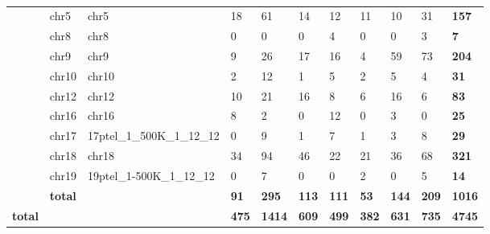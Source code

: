 \begin{samepage}
\begin{table}[h!]
\begin{tabular}{lllllllllll}
\textbf{}      & chr5                & chr5                            & 18             & 61             & 14             & 12             & 11             & 10             & 31             & \textbf{157}   \\
\textbf{}      & chr8                & chr8                            & 0              & 0              & 0              & 4              & 0              & 0              & 3              & \textbf{7}     \\
\textbf{}      & chr9                & chr9                            & 9              & 26             & 17             & 16             & 4              & 59             & 73             & \textbf{204}   \\
\textbf{}      & chr10               & chr10                           & 2              & 12             & 1              & 5              & 2              & 5              & 4              & \textbf{31}    \\
\textbf{}      & chr12               & chr12                           & 10             & 21             & 16             & 8              & 6              & 16             & 6              & \textbf{83}    \\
\textbf{}      & chr16               & chr16                           & 8              & 2              & 0              & 12             & 0              & 3              & 0              & \textbf{25}    \\
\textbf{}      & chr17               & 17ptel\_1\_500K\_1\_12\_12      & 0              & 9              & 1              & 7              & 1              & 3              & 8              & \textbf{29}    \\
\textbf{}      & chr18               & chr18                           & 34             & 94             & 46             & 22             & 21             & 36             & 68             & \textbf{321}   \\
\textbf{}      & chr19               & 19ptel\_1-500K\_1\_12\_12       & 0              & 7              & 0              & 0              & 2              & 0              & 5              & \textbf{14}    \\
\textbf{}      & \textbf{total}      & \textbf{}                       & \textbf{91}    & \textbf{295}   & \textbf{113}   & \textbf{111}   & \textbf{53}    & \textbf{144}   & \textbf{209}   & \textbf{1016}  \\
\textbf{total} & \textbf{}           & \textbf{}                       & \textbf{475}   & \textbf{1414}  & \textbf{609}   & \textbf{499}   & \textbf{382}   & \textbf{631}   & \textbf{735}   & \textbf{4745}  \\
\hline
\end{tabular}
\caption{}
\label{}
\end{table}
\end{samepage}
